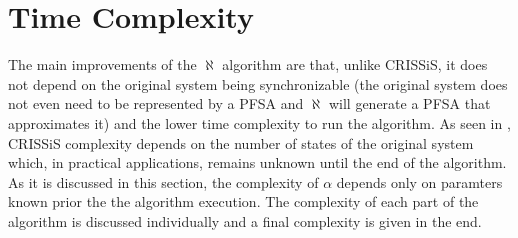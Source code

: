 {%
%
%
%
\section{Time Complexity}

The main improvements of the $\aleph$ algorithm are that, unlike CRISSiS, it does not depend on the original system being synchronizable (the original system does not even need to be represented by a PFSA and $\aleph$ will generate a PFSA that approximates it) and the lower time complexity to run the algorithm. As seen in \citep{asok.11}, CRISSiS complexity depends on the number of states of the original system which, in practical applications, remains unknown until the end of the algorithm. As it is discussed in this section, the complexity of $\alpha$ depends only on paramters known prior the the algorithm execution. The complexity of each part of the algorithm is discussed individually and a final complexity is given in the end.

}
